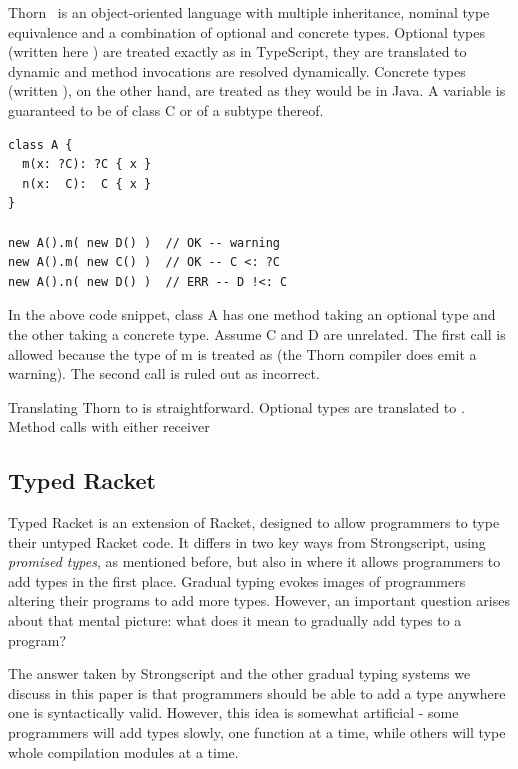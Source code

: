 \documentclass[a4paper,USenglish]{tex/lipics-v2016}
\begin{document}
Thorn~\cite{oopsla09} is an object-oriented language with multiple
inheritance, nominal type equivalence and a combination of optional and
concrete types.  Optional types (written here ) are treated exactly
as in TypeScript, they are translated to dynamic and method invocations are
resolved dynamically. Concrete types (written ), on the other hand,
are treated as they would be in Java. A variable  is guaranteed
to be of class \code C or of a subtype thereof.

\begin{lstlisting}
class A {
  m(x: ?C): ?C { x }
  n(x:  C):  C { x }
}

new A().m( new D() )  // OK -- warning
new A().m( new C() )  // OK -- C <: ?C
new A().n( new D() )  // ERR -- D !<: C
\end{lstlisting}

In the above code snippet, class \code A has one method taking an optional
type and the other taking a concrete type. Assume \code C and \code D are
unrelated. The first call is allowed because the type of \code m is treated
as \any (the Thorn compiler does emit a warning). The second call is ruled
out as incorrect.

Translating Thorn to \kafka is straightforward. Optional types are translated
to \any. Method calls with either receiver 

\subsection{Typed Racket}

Typed Racket is an extension of Racket, designed to allow programmers to
type their untyped Racket code. It differs in two key ways from
Strongscript, using \emph{promised types}, as mentioned before, but also in
where it allows programmers to add types in the first place. Gradual typing
evokes images of programmers altering their programs to add more
types. However, an important question arises about that mental picture: what
does it mean to gradually add types to a program?

The answer taken by Strongscript and the other gradual typing systems we
discuss in this paper is that programmers should be able to add a type
anywhere one is syntactically valid. However, this idea is somewhat
artificial - some programmers will add types slowly, one function at a time,
while others will type whole compilation modules at a time.
\end{document}
